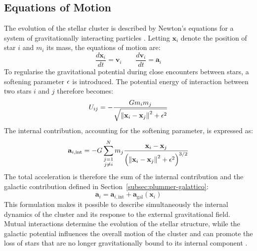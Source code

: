 \subsection{Equations of Motion}
\label{subsec:equazioni-moto}
The evolution of the stellar cluster is described by Newton's equations for a system of gravitationally interacting particles \cite{goldstein2002}. Letting $\mathbf{x}_i$ denote the position of star $i$ and $m_i$ its mass, the equations of motion are:
\begin{equation}
	\frac{d\mathbf{x}_i}{dt} = \mathbf{v}_i
	\qquad
	\frac{d\mathbf{v}_i}{dt} = \mathbf{a}_i
	\label{eq:equations-of-motion}
\end{equation}
To regularise the gravitational potential during close encounters between stars, a softening parameter $\epsilon$ is introduced. The potential energy of interaction between two stars $i$ and $j$ therefore becomes:
\begin{equation}
	U_{ij}=-\frac{G m_i m_j}
	{\sqrt{\left\|\mathbf{x}_i-\mathbf{x}_j\right\|^2+\epsilon^2}}
	\label{eq:softened-potential}
\end{equation}
The internal contribution, accounting for the softening parameter, is expressed as:
\begin{equation}
	\mathbf{a}_{i,\mathrm{int}} =
	-G\sum_{\substack{j=1\\j\neq i}}^N
	m_j
	\frac{\mathbf{x}_i-\mathbf{x}_j}
	{\left(\left\|\mathbf{x}_i-\mathbf{x}_j\right\|^2+\epsilon^2\right)^{3/2}}
	\label{eq:internal-gravitational-acceleration}
\end{equation}
The total acceleration is therefore the sum of the internal contribution and the galactic contribution defined in Section~\ref{subsec:plummer-galattico}:
\begin{equation}
	\mathbf{a}_i =
	\mathbf{a}_{i,\mathrm{int}} +
	\mathbf{a}_{\mathrm{gal}}(\mathbf{x}_i)
	\label{eq:total-acceleration}
\end{equation}
This formulation makes it possible to describe simultaneously the internal dynamics of the cluster and its response to the external gravitational field. Mutual interactions determine the evolution of the stellar structure, while the galactic potential influences the overall motion of the cluster and can promote the loss of stars that are no longer gravitationally bound to its internal component \cite{binneytremaine2008}.
